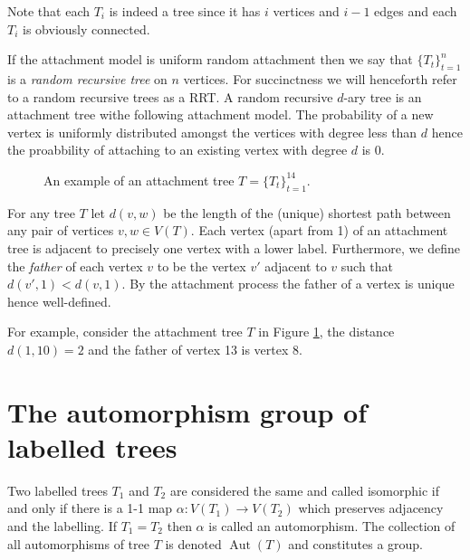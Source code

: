 \documentclass[oneside]{book} %
\theoremstyle{definition}
\numberwithin{equation}{section}
\DeclareMathOperator{\Aut}{Aut} %
\begin{document}
Note that each $T_i$ is indeed a tree since it has $i$ vertices and $i-1$ edges and each $T_i$ is obviously connected. 

If the attachment model is uniform random attachment then we say that $\{T_t\}_{t=1}^{n}$ is a \emph{ 
random recursive tree} on $n$ vertices. For succinctness we will henceforth refer to a random recursive trees as a RRT.  A random recursive $d$-ary tree is an attachment tree withe following attachment model.  The probability of a new vertex is uniformly distributed amongst the vertices with degree less than $d$ hence the proabbility of attaching to an existing vertex with degree $d$ is 0.   
\begin{figure}[ht]
\centering
{}
\caption{An example of an attachment tree $T = \{T_t\}_{t=1}^{14}$.}\label{fig1}
\end{figure}

For any tree $T$ let  $d(v,w)$ be the length of the (unique) shortest path between any pair of vertices $v,w \in V(T)$. 
Each vertex (apart from 1) of an attachment tree is adjacent to precisely one vertex with a lower label. Furthermore, we 
define the \emph{father} of each vertex $v$ to be the vertex $v'$ adjacent to $v$ such that $d(v',1)< d(v,1)$. By the attachment 
process the father of a vertex is unique hence well-defined.

For example, consider the attachment tree $T$ in Figure \ref{fig1}, the distance $d(1,10) = 2$ and the father of vertex 13 is vertex 8.

\section{The automorphism group of labelled trees}\label{sec:yo}
Two labelled trees $T_{1}$ and $T_2$ are considered the same and called isomorphic if and only if there is a 1-1 map $\alpha: V(T_1) \rightarrow V(T_2)$ which preserves adjacency and the labelling.  If $T_1 = T_2$ then $\alpha$ is called an automorphism.  The collection of all automorphisms of tree $T$ is  denoted $\Aut(T)$ and constitutes a group.
\end{document}
